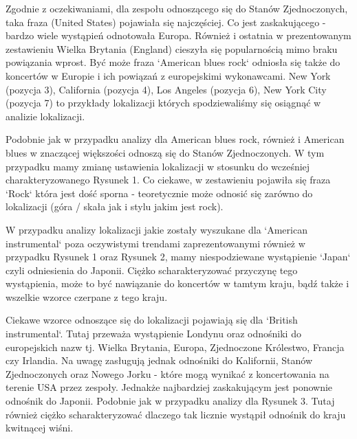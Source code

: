 \documentclass[journal]{article}
\begin{document}
\newcommand{\namefile}{../Lucene_project/results/cat_loc/cat_loc_American_blues_rock.csv}
\newcommand{\titleplot}{Najcześciej występujące lokalizacje dla grupy 'American blues rock'}
\newcommand{\column}{Location}
\newcommand{\labx}{Lokacje}
\newcommand{\laby}{Wystąpienia}

Zgodnie z oczekiwaniami, dla zespołu odnoszącego się do Stanów Zjednoczonych,
taka fraza (United States) pojawiała się najczęściej. Co jest zaskakującego -
bardzo wiele wystąpień odnotowała Europa. Również i ostatnia w prezentowanym
zestawieniu Wielka Brytania (England) cieszyła się popularnością mimo braku powiązania wprost.
Być może fraza `American blues rock` odniosła się także do koncertów w Europie
 i ich powiązań z europejskimi wykonawcami. New York (pozycja 3), California (pozycja 4),
 Los Angeles (pozycja 6), New York City (pozycja 7) to przykłady lokalizacji których
 spodziewaliśmy się osiągnąć w analizie lokalizacji.

 \renewcommand{\namefile}{../Lucene_project/results/cat_loc/cat_loc_American_blues.csv}
 \renewcommand{\titleplot}{Najcześciej występujące lokalizacje dla grupy 'American blues'}

Podobnie jak w przypadku analizy dla American blues rock, również i American blues
 w znaczącej większości odnoszą się do Stanów Zjednoczonych. W tym przypadku mamy
zmianę ustawienia lokalizacji w stosunku do wcześniej charakteryzowanego Rysunek 1.
Co ciekawe, w zestawieniu pojawiła się fraza `Rock` która jest dość sporna - teoretycznie
może odnosić się zarówno do lokalizacji (góra / skała jak i stylu jakim jest rock).

\renewcommand{\namefile}{../Lucene_project/results/cat_loc/cat_loc_American_instrumental.csv}
\renewcommand{\titleplot}{Najcześciej występujące lokalizacje dla grupy 'American instrumental'}

W przypadku analizy lokalizacji jakie zostały wyszukane dla `American instrumental`
poza oczywistymi trendami zaprezentowanymi również w przypadku Rysunek 1 oraz Rysunek 2,
 mamy niespodziewane wystąpienie `Japan` czyli odniesienia do Japonii.
 Ciężko scharakteryzować przyczynę tego wystąpienia, może to być nawiązanie do
koncertów w tamtym kraju, bądź także i wszelkie wzorce czerpane z tego kraju.

\renewcommand{\namefile}{../Lucene_project/results/cat_loc/cat_loc_British_instrumental.csv}
\renewcommand{\titleplot}{Najcześciej występujące lokalizacje dla grupy 'British instrumental'}

Ciekawe wzorce odnoszące się do lokalizacji pojawiają się dla `British instrumental`.
Tutaj przeważa wystąpienie Londynu oraz odnośniki do europejskich nazw tj. Wielka Brytania,
Europa, Zjednoczone Królestwo, Francja czy Irlandia.
Na uwagę zasługują jednak odnośniki do Kalifornii, Stanów Zjednoczonych oraz Nowego Jorku -
które mogą wynikać z koncertowania na terenie USA przez zespoły.
Jednakże najbardziej zaskakującym jest ponownie odnośnik do Japonii.
Podobnie jak w przypadku analizy dla Rysunek 3. Tutaj również ciężko scharakteryzować
 dlaczego tak licznie wystąpił odnośnik do kraju kwitnącej wiśni.
\end{document}

